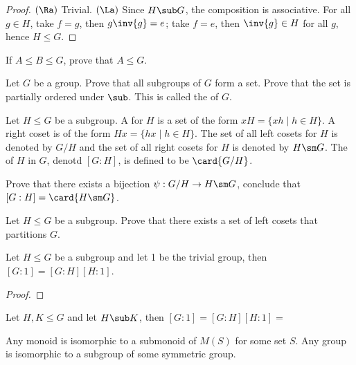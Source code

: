 \documentclass[10pt]{article}
\begin{document}
\begin{proof}
    $(\Ra)$ Trivial. $(\La)$ Since $H\sub G$, the composition is associative. For all $g\in H$, take $f=g$, then $g\inv{g}=e$; take $f=e$, then $\inv{g}\in H$ for all $g$, hence $H\le G$.
\end{proof}
\begin{problem}
    If $A\le B\le G$, prove that $A\le G$.
\end{problem}
\begin{problem}
    Let $G$ be a group. Prove that all subgroups of $G$ form a set. Prove that the set is partially ordered under $\sub$. This is called the  of $G$.
\end{problem}
\begin{definition}
    Let $H\le G$ be a subgroup. A  for $H$ is a set of the form $xH=\{xh\mid h\in H\}$. A right coset is of the form $Hx=\{hx\mid h\in H\}$. The set of all left cosets for $H$ is denoted by $G/H$ and the set of all right cosets for $H$ is denoted by $H\sm G$. The  of $H$ in $G$, denotd $[G:H]$, is defined to be $\card{G/H}$.
\end{definition}
\begin{problem}
    Prove that there exists a bijection $\psi:G/H\to H\sm G$, conclude that $[G:H]=\card{H\sm G}$.
\end{problem}
\begin{problem}
    Let $H\le G$ be a subgroup. Prove that there exists a set of left cosets that partitions $G$.
\end{problem}
\begin{proposition}
    Let $H\le G$ be a subgroup and let 1 be the trivial group, then $[G:1]=[G:H][H:1]$.
\end{proposition}
\begin{proof}
    
\end{proof}
\par
Let $H,K\le G$ and let $H\sub K$, then $[G:1]=[G:H][H:1]=$
\begin{theorem}
    Any monoid is isomorphic to a submonoid of $M(S)$ for some set $S$. Any group is isomorphic to a subgroup of some symmetric group.
\end{theorem}
\end{document}
